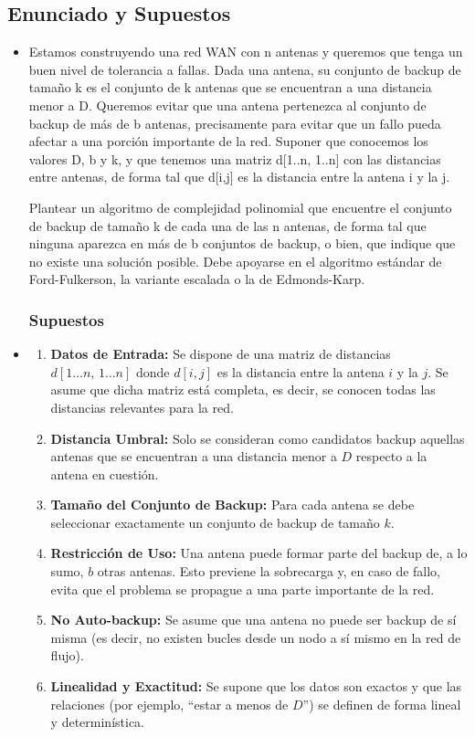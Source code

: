 \documentclass[a4paper, 12pt]{article}
\begin{document}
\subsection{Enunciado y Supuestos}
\begin{itemize}
    \subsubsection{Enunciado}
    \item Estamos construyendo una red WAN con n antenas y queremos que tenga un buen nivel de tolerancia a fallas. Dada una antena, su conjunto de backup de tamaño k es el conjunto de k antenas que se encuentran a una distancia menor a D. Queremos evitar que una antena pertenezca al conjunto de backup de más de b antenas, precisamente para evitar que un fallo pueda afectar a una porción importante de la red. Suponer que conocemos los valores D, b y k, y que tenemos una matriz d[1..n, 1..n] con las distancias entre antenas, de forma tal que d[i,j] es la distancia entre la antena i y la j. 
    
    Plantear un algoritmo de complejidad polinomial que encuentre el conjunto de backup de tamaño k de cada una de las n antenas, de forma tal que ninguna aparezca en más de b conjuntos de backup, o bien, que indique que no existe una solución posible. Debe apoyarse en el algoritmo estándar de Ford-Fulkerson, la variante escalada o la de Edmonds-Karp.
    \subsubsection{Supuestos}
    \item
    \begin{enumerate}[label=\arabic*.]
        \item \textbf{Datos de Entrada:} Se dispone de una matriz de distancias \(d[1 \dots n,\,1 \dots n]\) donde \(d[i,j]\) es la distancia entre la antena \(i\) y la \(j\). Se asume que dicha matriz está completa, es decir, se conocen todas las distancias relevantes para la red.
        \item \textbf{Distancia Umbral:} Solo se consideran como candidatos backup aquellas antenas que se encuentran a una distancia menor a \(D\) respecto a la antena en cuestión.
        \item \textbf{Tamaño del Conjunto de Backup:} Para cada antena se debe seleccionar exactamente un conjunto de backup de tamaño \(k\).
        \item \textbf{Restricción de Uso:} Una antena puede formar parte del backup de, a lo sumo, \(b\) otras antenas. Esto previene la sobrecarga y, en caso de fallo, evita que el problema se propague a una parte importante de la red.
        \item \textbf{No Auto-backup:} Se asume que una antena no puede ser backup de sí misma (es decir, no existen bucles desde un nodo a sí mismo en la red de flujo).
        \item \textbf{Linealidad y Exactitud:} Se supone que los datos son exactos y que las relaciones (por ejemplo, “estar a menos de \(D\)”) se definen de forma lineal y determinística.
    \end{enumerate}
    \end{itemize}
\end{document}

